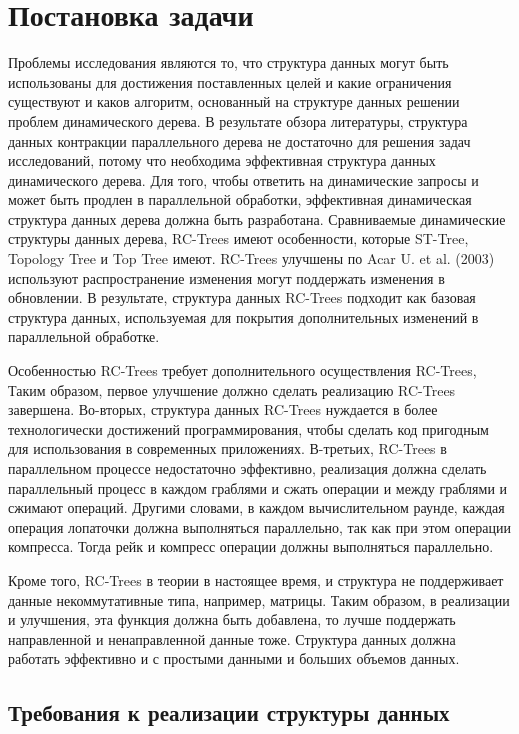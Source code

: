 \documentclass[specification,annotation]{itmo-student-thesis}
\newcommand{\revise}[1]{{\color{red!70!black} #1 }}
\begin{document}
\chapter{Постановка задачи}

\revise{
Проблемы исследования являются то, что структура данных могут быть использованы для достижения поставленных целей и какие ограничения существуют и каков алгоритм, основанный на структуре данных решении 
проблем динамического дерева. В результате обзора литературы, структура данных контракции параллельного дерева не достаточно для решения задач исследований, потому что необходима эффективная структура 
данных динамического дерева. Для того, чтобы ответить на динамические запросы и может быть продлен в параллельной обработки, эффективная динамическая структура данных дерева должна быть разработана. 
Сравниваемые динамические структуры данных дерева, RC-Trees имеют особенности, которые ST-Tree, Topology Tree и Top Tree имеют. RC-Trees улучшены по Acar U. et al. (2003) используют распространение 
изменения могут поддержать изменения в обновлении. В результате, структура данных RC-Trees подходит как базовая структура данных, используемая для покрытия дополнительных изменений в параллельной 
обработке.
}

\revise{
Особенностью RC-Trees требует дополнительного осуществления RC-Trees, Таким образом, первое улучшение должно сделать реализацию RC-Trees завершена. Во-вторых, структура данных RC-Trees нуждается в более 
технологически достижений программирования, чтобы сделать код пригодным для использования в современных приложениях. В-третьих, RC-Trees в параллельном процессе недостаточно эффективно, реализация должна 
сделать параллельный процесс в каждом граблями и сжать операции и между граблями и сжимают операций. Другими словами, в каждом вычислительном раунде, каждая операция лопаточки должна выполняться 
параллельно, так как при этом операции компресса. Тогда рейк и компресс операции должны выполняться параллельно.
}

\revise{
Кроме того, RC-Trees в теории в настоящее время, и структура не поддерживает данные некоммутативные типа, например, матрицы. Таким образом, в реализации и улучшения, эта функция должна быть добавлена, то 
лучше поддержать направленной и ненаправленной данные тоже. Структура данных должна работать эффективно и с простыми данными и больших объемов данных.
}

\section{Требования к реализации структуры данных}
\end{document}
